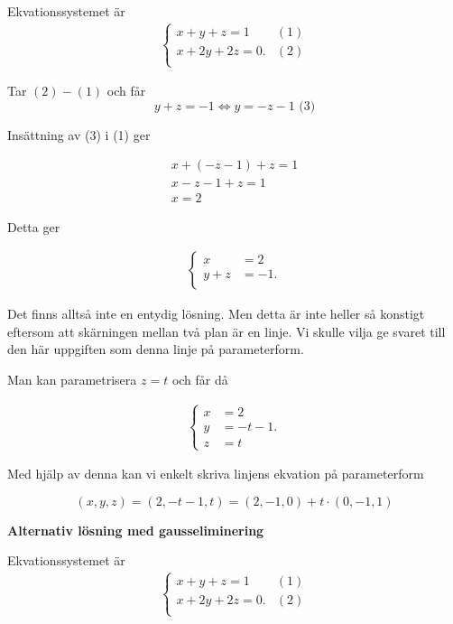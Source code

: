 \documentclass[../../main.tex]{subfiles}
\begin{document}
\begin{solution}{20}


Ekvationssystemet är 
\begin{align*}
    \begin{cases} 
     x+y+z=1  &(1)\\
    x+2y+2z=0.  &(2) \\
    \end{cases}
\end{align*}

Tar $(2) - (1)$ och får
$$y+z = -1 \iff y = -z -1 \text{ (3)}$$

Insättning av (3) i (1) ger

\begin{align*}
    x + (-z-1) + z = 1\\
    x - z - 1 + z = 1\\
    x = 2
\end{align*}

Detta ger

\begin{align*}
    \begin{cases} 
     x&=2 \\
     y+z&=-1. \\
    \end{cases}
\end{align*}

Det finns alltså inte en entydig lösning. Men detta är inte heller så konstigt eftersom att skärningen mellan två plan är en linje. Vi skulle vilja ge svaret till den här uppgiften som denna linje på parameterform.

Man kan parametrisera $z = t$ och får då

\begin{align*}
    \begin{cases} 
     x&=2 \\
     y&=-t-1. \\
     z&=t
    \end{cases}
\end{align*}

Med hjälp av denna kan vi enkelt skriva linjens ekvation på parameterform

$$(x, y, z) = (2, -t-1, t) = (2, -1, 0) + t\cdot (0, -1, 1)$$


\textbf{Alternativ lösning med gausseliminering}

Ekvationssystemet är 
\begin{align*}
    \begin{cases} 
     x+y+z=1  &(1)\\
    x+2y+2z=0.  &(2) \\
    \end{cases}
\end{align*}


\end{solution}
\end{document}
